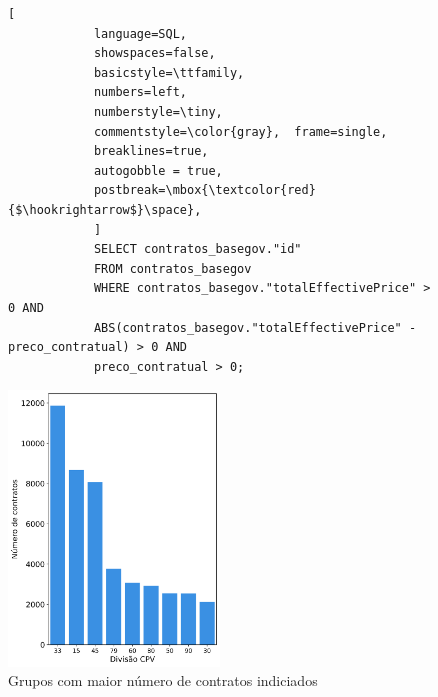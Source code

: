 %
%

\begin{figure}[H]
	\centering
	\begin{minipage}{.48\linewidth}
		\begin{lstlisting}[
			language=SQL,
			showspaces=false,
			basicstyle=\ttfamily,
			numbers=left,
			numberstyle=\tiny,
			commentstyle=\color{gray},	frame=single,
			breaklines=true,
			autogobble = true,
			postbreak=\mbox{\textcolor{red}{$\hookrightarrow$}\space},
			]
			SELECT contratos_basegov."id"
			FROM contratos_basegov 
			WHERE contratos_basegov."totalEffectivePrice" > 0 AND 
			ABS(contratos_basegov."totalEffectivePrice" - preco_contratual) > 0 AND 
			preco_contratual > 0;
		\end{lstlisting}
	\end{minipage}
	\hfill
	\begin{minipage}{.48\linewidth}
		\centering
		\includegraphics[width=0.5\textwidth]{imagens/rf2/main_cpvs.png}
		\caption{Grupos com maior número de contratos indiciados}
		\label{}
	\end{minipage}
\end{figure}


